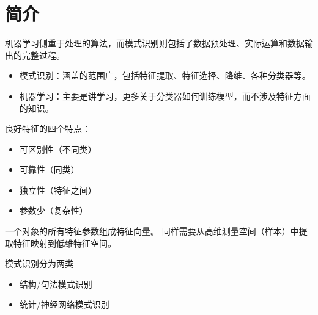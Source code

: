 
\section{简介} %
机器学习侧重于处理的算法，而模式识别则包括了数据预处理、实际运算和数据输出的完整过程。
\begin{itemize}
\item 模式识别：涵盖的范围广，包括特征提取、特征选择、降维、各种分类器等。
\item 机器学习：主要是讲学习，更多关于分类器如何训练模型，而不涉及特征方面的知识。
\end{itemize}

良好特征的四个特点：
\begin{itemize}
	\item 可区别性（不同类）
	\item 可靠性（同类）
	\item 独立性（特征之间）
	\item 参数少（复杂性）
\end{itemize}

一个对象的所有特征参数组成特征向量。
同样需要从高维测量空间（样本）中提取特征映射到低维特征空间。

模式识别分为两类
\begin{itemize}
	\item 结构/句法模式识别
	\item 统计/神经网络模式识别
\end{itemize}